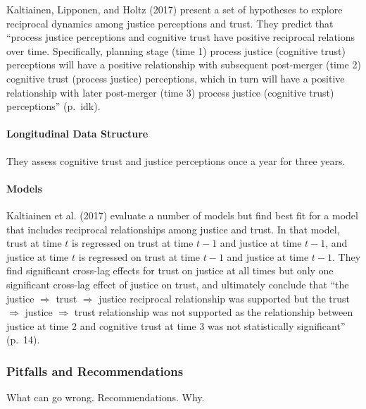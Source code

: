 \documentclass[english,,man]{apa6}
\let\oldparagraph\paragraph
\renewcommand{\paragraph}[1]{\oldparagraph{#1}\mbox{}}
\theoremstyle{definition}
\theoremstyle{definition}
\theoremstyle{definition}
\theoremstyle{remark}
\begin{document}
Kaltiainen, Lipponen, and Holtz (2017) present a set of hypotheses to
explore reciprocal dynamics among justice perceptions and trust. They
predict that \enquote{process justice perceptions and cognitive trust
have positive reciprocal relations over time. Specifically, planning
stage (time 1) process justice (cognitive trust) perceptions will have a
positive relationship with subsequent post-merger (time 2) cognitive
trust (process justice) perceptions, which in turn will have a positive
relationship with later post-merger (time 3) process justice (cognitive
trust) perceptions} (p.~idk).

\hypertarget{longitudinal-data-structure-6}{%
\paragraph{Longitudinal Data
Structure}\label{longitudinal-data-structure-6}}

They assess cognitive trust and justice perceptions once a year for
three years.

\hypertarget{models-10}{%
\paragraph{Models}\label{models-10}}

Kaltiainen et al. (2017) evaluate a number of models but find best fit
for a model that includes reciprocal relationships among justice and
trust. In that model, trust at time \(t\) is regressed on trust at time
\(t-1\) and justice at time \(t-1\), and justice at time \(t\) is
regressed on trust at time \(t-1\) and justice at time \(t-1\). They
find significant cross-lag effects for trust on justice at all times but
only one significant cross-lag effect of justice on trust, and
ultimately conclude that \enquote{the justice \({\Rightarrow}\) trust
\({\Rightarrow}\) justice reciprocal relationship was supported but the
trust \({\Rightarrow}\) justice \({\Rightarrow}\) trust relationship was
not supported as the relationship between justice at time 2 and
cognitive trust at time 3 was not statistically significant} (p.~14).

\hypertarget{pitfalls-and-recommendations-10}{%
\subsubsection{Pitfalls and
Recommendations}\label{pitfalls-and-recommendations-10}}

What can go wrong. Recommendations. Why.
\end{document}
